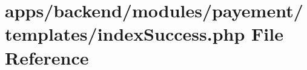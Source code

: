 \hypertarget{backend_2modules_2payement_2templates_2index_success_8php}{\section{apps/backend/modules/payement/templates/index\-Success.php File Reference}
\label{backend_2modules_2payement_2templates_2index_success_8php}
}
